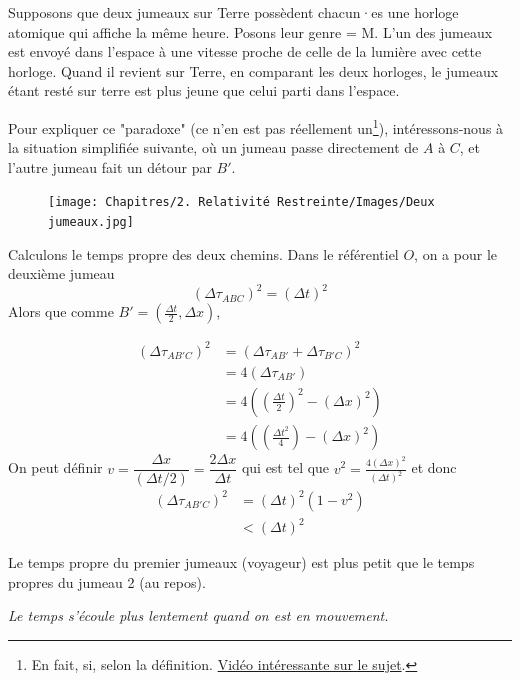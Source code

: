 \begin{exmp}
    Supposons que deux jumeaux sur Terre possèdent chacun·es une horloge atomique qui affiche la même heure. Posons leur genre = M. L'un des jumeaux est envoyé dans l'espace à une vitesse proche de celle de la lumière avec cette horloge. Quand il revient sur Terre, en comparant les deux horloges, le jumeaux étant resté sur terre est plus jeune que celui parti dans l'espace. 
\end{exmp}
Pour expliquer ce "paradoxe" (ce n'en est pas réellement un\footnote{En fait, si, selon la définition. \href{https://www.youtube.com/watch?v=ppX7Qjbe6BM}{Vidéo intéressante sur le sujet}.}), intéressons-nous à la situation simplifiée suivante, où un jumeau passe directement de $A$ à $C$, et l'autre jumeau fait un détour par $B'$.
\begin{figure}[H]
    \centering
    \texttt{[image: Chapitres/2. Relativité Restreinte/Images/Deux jumeaux.jpg]}
    \caption{}
    \label{fig:2.5}
\end{figure}

Calculons le temps propre des deux chemins. Dans le référentiel $O$, on a pour le deuxième jumeau
\begin{equation}
    (\Delta \tau_{ABC})^2 = (\Delta t)^2
\end{equation} 
Alors que comme $B'=(\frac{\Delta t}{2},\Delta x)$,

\begin{align}
        (\Delta \tau_{AB'C})^2 &= (\Delta \tau_{AB'} + \Delta \tau_{B'C})^2\\
        &= 4(\Delta \tau_{AB'})\\
        &= 4 \left(\left(\frac{\Delta t}{2}\right)^2 - (\Delta x)^2\right)\\
        &= 4 \left(\left(\frac{\Delta t^2}{4}\right) - (\Delta x)^2\right)
    \end{align}
    On peut définir $v = \dfrac{\Delta x}{(\Delta t/2)} = \dfrac{2 \Delta x}{\Delta t}$ qui est tel que $v^2 = \frac{4(\Delta x)^2}{(\Delta t)^2}$ et donc
    \begin{align*}
        (\Delta \tau_{AB'C})^2 &= (\Delta t)^2(1 - v^2)\\
        &< (\Delta t)^2
    \end{align*}

Le temps propre du premier jumeaux (voyageur) est plus petit que le temps propres du jumeau 2 (au repos). 
\begin{center}
    \textit{Le temps s'écoule plus lentement quand on est en mouvement.}
\end{center}

